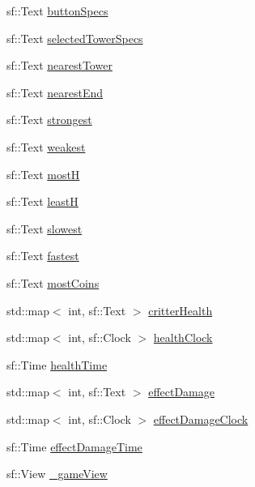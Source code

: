 \begin{DoxyCompactItemize}
\item 
sf\+::\+Text \hyperlink{class_game_state_play_a65d1a4d74f886ce3de872c1ffbb63d57}{button\+Specs}
\item 
sf\+::\+Text \hyperlink{class_game_state_play_ac8809caa817213fe1b78749b3b19ad6f}{selected\+Tower\+Specs}
\item 
sf\+::\+Text \hyperlink{class_game_state_play_ae1ee7931ef89e141f54ad6588759ea6f}{nearest\+Tower}
\item 
sf\+::\+Text \hyperlink{class_game_state_play_a4ca301f18fc6be19a8465721a6c3bb1f}{nearest\+End}
\item 
sf\+::\+Text \hyperlink{class_game_state_play_a19bbd6c5ddab619c2fed65c1a368395d}{strongest}
\item 
sf\+::\+Text \hyperlink{class_game_state_play_aa528568bfe4f5fcc79605557c6d0d12d}{weakest}
\item 
sf\+::\+Text \hyperlink{class_game_state_play_a1ff2a6f5c9983a5240afa2aa94c3d034}{most\+H}
\item 
sf\+::\+Text \hyperlink{class_game_state_play_a68ba25d35cbc05415be9173aac2ce4c1}{least\+H}
\item 
sf\+::\+Text \hyperlink{class_game_state_play_aa5a191ff7adb99b88d5c967f44880264}{slowest}
\item 
sf\+::\+Text \hyperlink{class_game_state_play_a6b8fba9f1816c183dc546ccbe8fc04cc}{fastest}
\item 
sf\+::\+Text \hyperlink{class_game_state_play_a2d77b920db04a5a69e86625200631dd7}{most\+Coins}
\item 
std\+::map$<$ int, sf\+::\+Text $>$ \hyperlink{class_game_state_play_a7ca10b4aceefc0e2732ec427c5b5b5c5}{critter\+Health}
\item 
std\+::map$<$ int, sf\+::\+Clock $>$ \hyperlink{class_game_state_play_af65d40be0eb5748b1d80186cefd3cc71}{health\+Clock}
\item 
sf\+::\+Time \hyperlink{class_game_state_play_a4a2fd0f59504ad64f5d8b871cbf3cd35}{health\+Time}
\item 
std\+::map$<$ int, sf\+::\+Text $>$ \hyperlink{class_game_state_play_a2c0118859e607a1ef2aa008f1b94b7f8}{effect\+Damage}
\item 
std\+::map$<$ int, sf\+::\+Clock $>$ \hyperlink{class_game_state_play_a672216db210bc2dca82196badc7c20e9}{effect\+Damage\+Clock}
\item 
sf\+::\+Time \hyperlink{class_game_state_play_a9d324dec79041681951cf84349507e7f}{effect\+Damage\+Time}
\item 
sf\+::\+View \hyperlink{class_game_state_play_a9513cfeac2178d83e23ba6f9291fba8c}{\+\_\+game\+View}

\end{DoxyCompactItemize}
